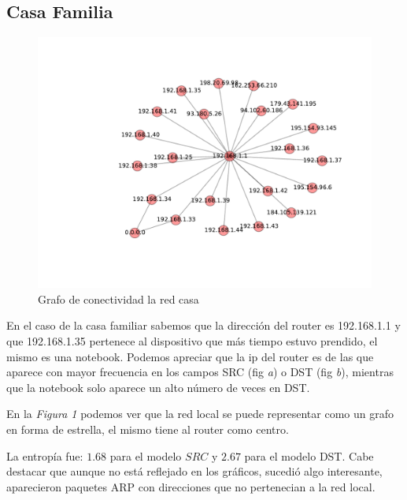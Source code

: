 \subsection{Casa Familia}

\FloatBarrier

\FloatBarrier

\begin{figure}[!h]
	\begin{center}
		  \includegraphics[scale=0.75]{resultados/casa/conectividadNX.pdf}
		  \caption{Grafo de conectividad la red casa}
		  \label{fig:contra1}
	\end{center}
\end{figure}
	
\FloatBarrier

En el caso de la casa familiar sabemos que la direcci\'on del router
es 192.168.1.1 y que 192.168.1.35 pertenece al dispositivo que m\'as tiempo estuvo
prendido, el mismo es una notebook. Podemos apreciar que la ip del
router es de las que aparece con mayor frecuencia en los campos SRC (fig \emph{a}) 
o DST (fig \emph{b}), mientras que la notebook solo aparece un alto n\'umero de 
veces en DST. 

En la \emph{Figura 1} podemos ver que la red local se puede representar como 
un grafo en forma de estrella, el mismo tiene al router como centro. 

La entrop\'ia fue: $1.68$ para el modelo $SRC$ y $2.67$ para el modelo DST.
Cabe destacar que aunque no est\'a reflejado en los gr\'aficos, sucedi\'o algo interesante, 
aparecieron paquetes ARP con direcciones que no pertenecian a la red local.

